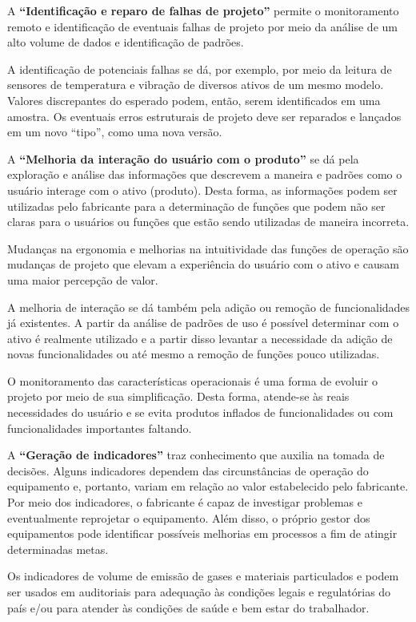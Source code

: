 A \textbf{``Identificação e reparo de falhas de projeto''} permite o monitoramento remoto e identificação de eventuais falhas de projeto por meio da análise de um alto volume de dados e identificação de padrões.

A  identificação de potenciais falhas se dá, por exemplo, por meio da leitura de sensores de temperatura e vibração de diversos ativos de um mesmo modelo. Valores discrepantes do esperado podem, então, serem identificados em uma amostra. Os eventuais erros estruturais de projeto deve ser reparados e lançados em um novo ``tipo'', como uma nova versão.

A \textbf{``Melhoria da interação do usuário com o produto''} se dá pela exploração e análise das informações que descrevem a maneira e padrões como o usuário interage com o ativo (produto). Desta forma, as informações podem ser utilizadas pelo fabricante para a determinação de funções que podem não ser claras para o usuários ou funções que estão sendo utilizadas de maneira incorreta.

Mudanças na ergonomia e melhorias na intuitividade das funções de operação são mudanças de projeto que elevam a experiência do usuário com o ativo e causam uma maior percepção de valor.

A melhoria de interação se dá também pela adição ou remoção de funcionalidades já existentes. A partir da análise de padrões de uso é possível determinar com o ativo é realmente utilizado e a partir disso levantar a necessidade da adição de novas funcionalidades ou até mesmo a remoção de funções pouco utilizadas.

O monitoramento das características operacionais é uma forma de evoluir o projeto por meio de sua simplificação. Desta forma, atende-se às reais necessidades do usuário e se evita produtos inflados de funcionalidades ou com funcionalidades importantes faltando.

A \textbf{``Geração de indicadores''} traz conhecimento que auxilia na tomada de decisões. Alguns indicadores dependem das circunstâncias de operação do equipamento e, portanto, variam em relação ao valor estabelecido pelo fabricante. Por meio dos indicadores, o fabricante é capaz de investigar problemas e eventualmente reprojetar o equipamento. Além disso, o próprio gestor dos equipamentos pode identificar possíveis melhorias em processos a fim de atingir determinadas metas.

Os indicadores de  volume de emissão de gases e materiais particulados e podem ser usados em auditoriais para adequação às condições legais e regulatórias do país e/ou para atender às condições de saúde e bem estar do trabalhador.

